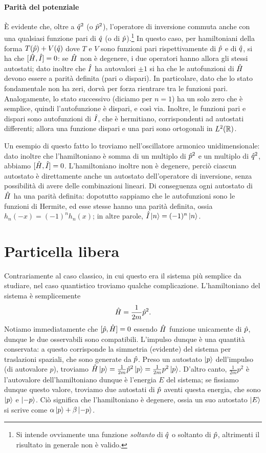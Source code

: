 \paragraph{Parità del potenziale}
È evidente che, oltre a $\hat{q}^2$ (o $\hat{p}^2$), l'operatore di inversione commuta anche con una qualsiasi funzione pari di $\hat{q}$ (o di $\hat{p}$).\footnote{Si intende ovviamente una funzione \emph{soltanto} di $\hat{q}$ o soltanto di $\hat{p}$, altrimenti il risultato in generale non è valido.}
In questo caso, per hamiltoniani della forma $T(\hat{p})+V(\hat{q})$ dove $T$ e $V$ sono funzioni pari rispettivamente di $\hat{p}$ e di $\hat{q}$, si ha che $[\hat{H},\hat{I}]=0$: se $\hat{H}$ non è degenere, i due operatori hanno allora gli stessi autostati; dato inoltre che $\hat{I}$ ha autovalori $\pm 1$ si ha che le autofunzioni di $\hat{H}$ devono essere a parità definita (pari o dispari).
In particolare, dato che lo stato fondamentale non ha zeri, dorvà per forza rientrare tra le funzioni pari.
Analogamente, lo stato successivo (diciamo per $n=1$) ha un solo zero che è semplice, quindi l'autofunzione è dispari, e cos\`i via.
Inoltre, le funzioni pari e dispari sono autofunzioni di $\hat{I}$, che è hermitiano, corrispondenti ad autostati differenti; allora una funzione dispari e una pari sono ortogonali in $L^2(\mathbb{R})$.

Un esempio di questo fatto lo troviamo nell'oscillatore armonico unidimensionale: dato inoltre che l'hamiltoniano è somma di un multiplo di $\hat{p}^2$ e un multiplo di $\hat{q}^2$, abbiamo $[\hat{H},\hat{I}]=0$.
L'hamiltoniano inoltre non è degenere, perciò ciascun autostato è direttamente anche un autostato dell'operatore di inversione, senza possibilità di avere delle combinazioni lineari.
Di conseguenza ogni autostato di $\hat{H}$ ha una parità definita: dopotutto sappiamo che le autofunzioni sono le funzioni di Hermite, ed esse stesse hanno una parità definita, ossia $h_n(-x)=(-1)^nh_n(x)$; in altre parole, $\hat{I}\left|{n}\right\rangle=(-1)^n\left|{n}\right\rangle$.

\section{Particella libera}
Contrariamente al caso classico, in cui questo era il sistema più semplice da studiare, nel caso quantistico troviamo qualche complicazione.
L'hamiltoniano del sistema è semplicemente
\begin{equation}
	\hat{H}=\frac1{2m}\hat{p}^2.
	\label{eq:H-particella-libera}
\end{equation}
Notiamo immediatamente che $[\hat{p},\hat{H}]=0$ essendo $\hat{H}$ funzione unicamente di $\hat{p}$, dunque le due osservabili sono compatibili.
L'impulso dunque è una quantità conservata: a questo corrisponde la simmetria (evidente) del sistema per traslazioni spaziali, che sono generate da $\hat{p}$.
Preso un autostato $\left|{p}\right\rangle$ dell'impulso (di autovalore $p$), troviamo $\hat{H}\left|{p}\right\rangle=\frac1{2m}\hat{p}^2\left|{p}\right\rangle=\frac1{2m}p^2\left|{p}\right\rangle$.
D'altro canto, $\frac1{2m}p^2$ è l'autovalore dell'hamiltoniano dunque è l'energia $E$ del sistema; se fissiamo dunque questo valore, troviamo due autostati di $\hat{p}$ aventi questa energia, che sono $\left|{p}\right\rangle$ e $\left|{-p}\right\rangle$.
Ciò significa che l'hamiltoniano è degenere, ossia un suo autostato $\left|{E}\right\rangle$ si scrive come $\alpha\left|{p}\right\rangle+\beta\left|{-p}\right\rangle$.

